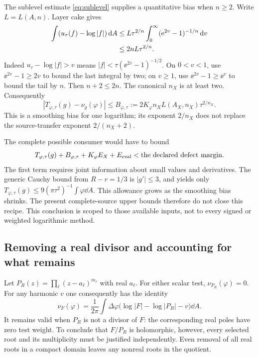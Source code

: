 The sublevel estimate \eqref{eq:sublevel} supplies a quantitative
bias when $n\ge2$. Write $L=L(A,n)$. Layer cake gives
\begin{align}
 \int(u_\tau(f)-\log|f|)\,\mathrm d A
 &\le L\tau^{2/n}
       \int_0^\infty(\mathrm e^{2v}-1)^{-1/n}\,\mathrm d v\notag\\
 &\le 2nL\tau^{2/n}.\label{eq:regularization-bias}
\end{align}
Indeed $u_\tau-\log|f|>v$ means
$|f|<\tau(\ee^{2v}-1)^{-1/2}$.
On $0<v<1$, use $\ee^{2v}-1\ge2v$ to bound the last integral
by two; on $v\ge1$, use $\ee^{2v}-1\ge\ee^v$ to bound the
tail by $n$. Then $n+2\le2n$.
The canonical $n_X$ is at least two. Consequently
\[
 |T_{\varphi,\tau}(g)-\nu_g(\varphi)|
 \le B_{\varphi,\tau}
 :=2K_\varphi n_XL(A_X,n_X)\tau^{2/n_X}.
\]
This is a smoothing bias for one logarithm; its exponent
$2/n_X$ does not replace the source-transfer exponent
$2/(n_X+2)$.

The complete possible consumer would have to bound
\begin{equation}\label{eq:regularized-consumer}
 T_{\varphi,\tau}(g)+B_{\varphi,\tau}
       +K_\varphi E_X+E_{\rm eval}
       <\hbox{the declared defect margin}.
\end{equation}
The first term requires joint information about small values and
derivatives. The generic Cauchy bound from $R-r=1/3$ is
$|g'|\le3$, and yields only
$T_{\varphi,\tau}(g)\le9(\pi\tau^2)^{-1}\int\varphi\dd A$.
This allowance grows as the smoothing bias shrinks. The present
complete-source upper bounds therefore do not close this recipe.
This conclusion is scoped to those available inputs, not to
every signed or weighted logarithmic method.

\subsection{Removing a real divisor and accounting for what remains}

Let $P_R(z)=\prod_\ell(z-a_\ell)^{m_\ell}$ with real $a_\ell$.
For either scalar test, $\nu_{P_R}(\varphi)=0$.
For any harmonic $v$ one consequently has the identity
\begin{equation}\label{eq:real-divisor}
 \nu_F(\varphi)=\frac1{2\pi}\int\Delta\varphi
     \bigl(\log|F|-\log|P_R|-v\bigr)\dd A.
\end{equation}
It remains valid when $P_R$ is not a divisor of $F$: the
corresponding real poles have zero test weight.
To conclude that $F/P_R$ is holomorphic, however, every selected
root and its multiplicity must be justified independently.
Even removal of all real roots in a compact domain leaves any
nonreal roots in the quotient.

